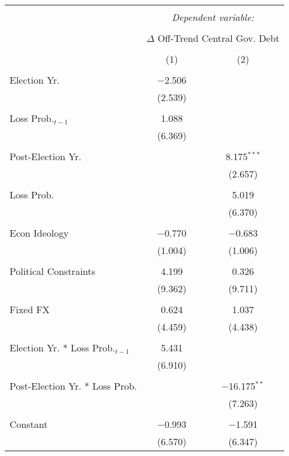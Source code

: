 
\begingroup 
\tiny 
\begin{tabular}{@{\extracolsep{5pt}}lcc} 
\\[-1.8ex]\hline 
\hline \\[-1.8ex] 
 & \multicolumn{2}{c}{\textit{Dependent variable:}} \\ 
\cline{2-3} 
\\[-1.8ex] & \multicolumn{2}{c}{$\Delta$ Off-Trend Central Gov. Debt} \\ 
\\[-1.8ex] & (1) & (2)\\ 
\hline \\[-1.8ex] 
 Election Yr. & $-$2.506 &  \\ 
  & (2.539) &  \\ 
  & & \\ 
 Loss Prob.$_{t-1}$ & 1.088 &  \\ 
  & (6.369) &  \\ 
  & & \\ 
 Post-Election Yr. &  & 8.175$^{***}$ \\ 
  &  & (2.657) \\ 
  & & \\ 
 Loss Prob. &  & 5.019 \\ 
  &  & (6.370) \\ 
  & & \\ 
 Econ Ideology & $-$0.770 & $-$0.683 \\ 
  & (1.004) & (1.006) \\ 
  & & \\ 
 Political Constraints & 4.199 & 0.326 \\ 
  & (9.362) & (9.711) \\ 
  & & \\ 
 Fixed FX & 0.624 & 1.037 \\ 
  & (4.459) & (4.438) \\ 
  & & \\ 
 Election Yr. * Loss Prob.$_{t-1}$ & 5.431 &  \\ 
  & (6.910) &  \\ 
  & & \\ 
 Post-Election Yr. * Loss Prob. &  & $-$16.175$^{**}$ \\ 
  &  & (7.263) \\ 
  & & \\ 
 Constant & $-$0.993 & $-$1.591 \\ 
  & (6.570) & (6.347) \\ 

\end{tabular}
